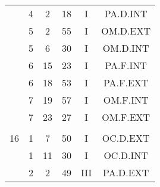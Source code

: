 \documentclass[12pt, a4paper]{article}
\begin{document}
\begin{multicols}{3}
{\begin{tabular}{c c c c c c}
	 	 	 	 & 4 & 2 & 18 & I & PA.D.INT\\%
	 	 	 	 & 5 & 2 & 55 & I & OM.D.EXT\\%
	 	 	 	 & 5 & 6 & 30 & I & OM.D.INT\\%
	 	 	 	 & 6 & 15 & 23 & I & PA.F.INT\\%
	 	 	 	 & 6 & 18 & 53 & I & PA.F.EXT\\%
	 	 	 	 & 7 & 19 & 57 & I & OM.F.INT\\%
	 	 	 	 & 7 & 23 & 27 & I & OM.F.EXT\\%
	 	 	 	 & & & & & \\%
	 	 	 	16 & 1 & 7 & 50 & I & OC.D.EXT\\%
	 	 	 	 & 1 & 11 & 30 & I & OC.D.INT\\%
	 	 	 	 & 2 & 2 & 49 & III & PA.D.EXT\\%
	 	 \end{tabular}
 	}
\end{multicols}
\end{document}

